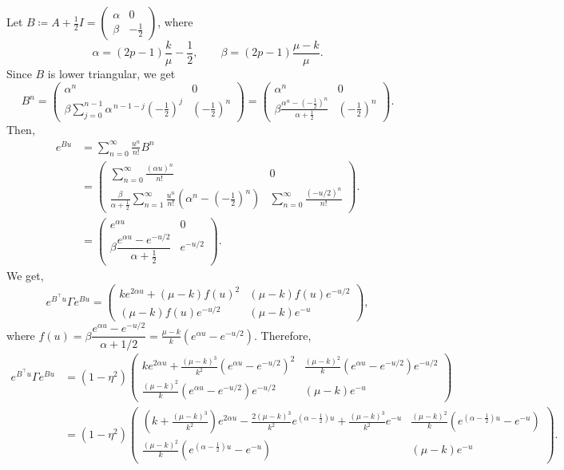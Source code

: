 \documentclass{article}
\numberwithin{equation}{section}
\newcommand{\1}{\mathbf{1}}
\newcommand{\0}{\mathbf{0}}
\begin{document}
\noindent Let $B \coloneqq A+\frac12 I= \begin{pmatrix}
\alpha & 0\\
\beta & -\frac12
\end{pmatrix}$,
where
\[
\alpha=(2p-1)\frac{k}{\mu}-\frac12,
\qquad
\beta=(2p-1)\frac{\mu-k}{\mu}.
\]
Since $B$ is lower triangular, we get
\[
B^n=
\begin{pmatrix}
\alpha^n & 0  \\ 
\beta\sum_{j=0}^{n-1}\alpha^{\,n-1-j} \left(-\frac12\right)^j & \left(-\frac12\right)^n
\end{pmatrix} 
= 
\begin{pmatrix}
\alpha^n & 0\\
\beta \frac{\alpha^n-\left(-\frac12\right)^n}
{\alpha+\frac12} & \left(-\frac12\right)^n
\end{pmatrix}.
\]
Then, 
\begin{align*}
e^{Bu}
&= \sum_{n=0}^{\infty} \frac{u^n}{n!}B^n \\
&= \begin{pmatrix}
\sum_{n=0}^{\infty}\frac{(\alpha u)^n}{n!} & 0 \\
\frac{\beta}{\alpha+\frac12}\sum_{n=1}^{\infty}\frac{u^n}{n!} \left(\alpha^n-\left(-\frac{1}{2}\right)^n\right)
& \sum_{n=0}^{\infty}\frac{(-u/2)^n}{n!}
\end{pmatrix}. \\
&= \begin{pmatrix}
e^{\alpha u} & 0 \\
\beta \dfrac{e^{\alpha u}-e^{-u/2}}{\alpha+\frac{1}{2}} & e^{-u/2}
\end{pmatrix}.
\end{align*}
We get,
\[ e^{B^\top u} \Gamma e^{Bu} = \begin{pmatrix}
    ke^{2\alpha u} + (\mu-k)f(u)^2 & (\mu-k)f(u) e^{-u/2} \\
    (\mu-k)f(u)e^{-u/2} & (\mu-k)e^{-u}
\end{pmatrix},\]
where $f(u) = \beta \dfrac{e^{\alpha u}-e^{-u/2}}{\alpha + 1/2} = \frac{\mu - k}{k}(e^{\alpha u}-e^{-u/2})$. Therefore,
\begin{align*} 
e^{B^\top u} \Gamma e^{Bu} &= (1-\eta^2) \begin{pmatrix}
    ke^{2\alpha u} + \frac{(\mu-k)^3}{k^2}(e^{\alpha u}-e^{-u/2})^2 & \frac{(\mu-k)^2}{k} (e^{\alpha u}-e^{-u/2}) e^{-u/2} \\
    \frac{(\mu-k)^2}{k}(e^{\alpha u}-e^{-u/2})e^{-u/2} & (\mu-k)e^{-u}
\end{pmatrix} \\
& =
(1-\eta^2)\begin{pmatrix}
\left( k+\frac{(\mu-k)^3}{k^2}
\right)e^{2\alpha u} -\frac{2(\mu-k)^3}{k^2} e^{(\alpha-\frac{1}{2})u} +\frac{(\mu-k)^3}{k^2}e^{-u}
&
\frac{(\mu-k)^2}{k} \left(e^{(\alpha-\frac{1}{2})u} -e^{-u}
\right) \\
\frac{(\mu-k)^2}{k}
\left(e^{(\alpha-\frac{1}{2})u}
-e^{-u} \right)
&
(\mu-k)e^{-u}
\end{pmatrix}.
\end{align*}
\end{document}
